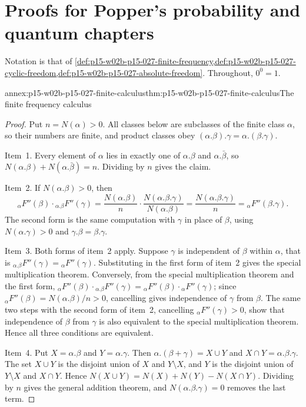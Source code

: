 \section{Proofs for Popper's probability and quantum chapters}
\label{sec:annex-p15-w02b-p15-027}

Notation is that of \cref{def:p15-w02b-p15-027-finite-frequency,def:p15-w02b-p15-027-cyclic-freedom,def:p15-w02b-p15-027-absolute-freedom}.
Throughout, \(0^0=1\).

\begin{annexitem}{annex:p15-w02b-p15-027-finite-calculus}{thm:p15-w02b-p15-027-finite-calculus}{The finite frequency calculus}
\begin{proof}
Put \(n=N(\alpha)>0\). All classes below are subclasses of the finite
class \(\alpha\), so their numbers are finite, and product classes obey
\((\alpha.\beta).\gamma=\alpha.(\beta.\gamma)\).

Item~1. Every element of \(\alpha\) lies in exactly one of
\(\alpha.\beta\) and \(\alpha.\bar\beta\), so
\(N(\alpha.\beta)+N(\alpha.\bar\beta)=n\). Dividing by \(n\) gives the claim.

Item~2. If \(N(\alpha.\beta)>0\), then
\[
 {}_{\alpha}F''(\beta)\cdot{}_{\alpha.\beta}F''(\gamma)
 =\frac{N(\alpha.\beta)}{n}\cdot\frac{N(\alpha.\beta.\gamma)}{N(\alpha.\beta)}
 =\frac{N(\alpha.\beta.\gamma)}{n}={}_{\alpha}F''(\beta.\gamma).
\]
The second form is the same computation with \(\gamma\) in place of
\(\beta\), using \(N(\alpha.\gamma)>0\) and \(\gamma.\beta=\beta.\gamma\).

Item~3. Both forms of item~2 apply. Suppose \(\gamma\) is independent of
\(\beta\) within \(\alpha\), that is
\({}_{\alpha.\beta}F''(\gamma)={}_{\alpha}F''(\gamma)\). Substituting in the
first form of item~2 gives the special multiplication theorem.
Conversely, from the special multiplication theorem and the first form,
\({}_{\alpha}F''(\beta)\cdot{}_{\alpha.\beta}F''(\gamma)
={}_{\alpha}F''(\beta)\cdot{}_{\alpha}F''(\gamma)\); since
\({}_{\alpha}F''(\beta)=N(\alpha.\beta)/n>0\), cancelling gives
independence of \(\gamma\) from \(\beta\). The same two steps with the
second form of item~2, cancelling \({}_{\alpha}F''(\gamma)>0\), show that
independence of \(\beta\) from \(\gamma\) is also equivalent to the special
multiplication theorem. Hence all three conditions are equivalent.

Item~4. Put \(X=\alpha.\beta\) and \(Y=\alpha.\gamma\). Then
\(\alpha.(\beta+\gamma)=X\cup Y\) and \(X\cap Y=\alpha.\beta.\gamma\).
The set \(X\cup Y\) is the disjoint union of \(X\) and \(Y\setminus X\), and
\(Y\) is the disjoint union of \(Y\setminus X\) and \(X\cap Y\). Hence
\(N(X\cup Y)=N(X)+N(Y)-N(X\cap Y)\). Dividing by \(n\) gives the general
addition theorem, and \(N(\alpha.\beta.\gamma)=0\) removes the last term.


\end{proof}
\end{annexitem}
